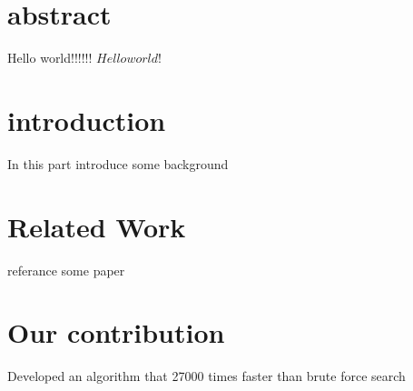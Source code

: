 \documentclass[twocolumn]{article}
\begin{document}
\section{abstract}
Hello world!!!!!!
$Hello world!$ %
\section{introduction}
In this part introduce some background
\section{Related Work}
referance some paper
\section{Our contribution}
Developed an algorithm that 27000 times faster than brute force search
\end{document}
